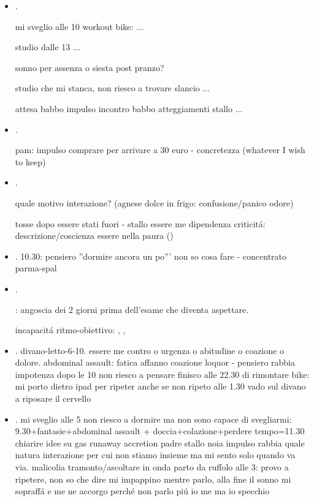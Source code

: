 \begin{itemize}
alle 8.30-10: workout-considerazioni su come descrivere concretamente quello che sono di solito
distanza da obiettivo studio-distanza da pensiero concretezza: 
pranzo-pisolino 13.30-16: data an analysis (confuso: non riesco a seguire la lezione registrata) 17-19.30 20-20.30 obstech: 

\item {}.

mi sveglio alle 10 workout bike: ...

studio dalle 13 ...

sonno per assenza o siesta post pranzo?

studio che mi stanca, non riesco a trovare slancio ...

attesa babbo impulso incontro babbo atteggiamenti stallo ...

\item {}.

pam: impulso comprare per arrivare a 30 euro - concretezza (whatever I wish to keep)

\item {}.

quale motivo interazione? (agnese dolce in frigo: confusione/panico odore)

tosse dopo essere stati fuori - stallo essere me dipendenza criticit\'a: descrizione/coscienza essere nella paura ()

\item {}.
10.30: pensiero ''dormire ancora un po''' non so cosa fare - concentrato parma-spal

\item {}.

: angoscia dei 2 giorni prima dell'esame che diventa aspettare.

incapacit\'a ritmo-obiettivo: , , 

\item {}.
divano-letto-6-10. essere me contro o urgenza o abitudine o coazione o dolore.
abdominal assault: fatica affanno coazione loquor - pensiero rabbia impotenza
dopo le 10 non riesco a pensare
finisco alle 22.30 di rimontare bike: mi porto dietro ipad per ripeter anche se non ripeto
alle 1.30 vado sul divano a riposare il cervello
\item {}.
mi sveglio alle 5 non riesco a dormire ma non sono capace di svegliarmi: 9.30+fantasie+abdominal assault + doccia+colazione+perdere tempo=11.30
chiarire idee su gas runaway accretion
padre stallo noia impulso rabbia quale natura interazione per cui non stiamo insieme ma mi sento solo quando va via.
malicolia tramonto/ascoltare in onda
parto da ruffolo alle 3: provo a ripetere, non so che dire mi impappino mentre parlo, alla fine il sonno mi sopraff\'a e me ne accorgo perch\'e non parlo pi\'u io me ma io specchio


\end{itemize}
